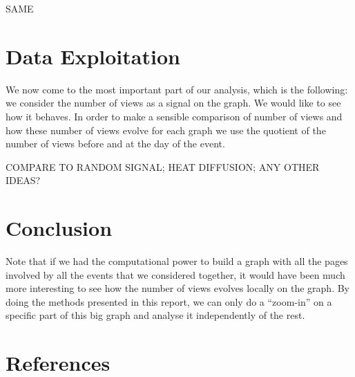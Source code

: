 \documentclass[conference]{IEEEtran}
\begin{document}
SAME 

\section{Data Exploitation} \label{exploitation}

We now come to the most important part of our analysis, which is the following: we consider the number of views as a signal on the graph. We would like to see how it behaves. In order to make a sensible comparison of number of views and how these number of views evolve for each graph we use the quotient of the number of views before and at the day of the event. 

COMPARE TO RANDOM SIGNAL; HEAT DIFFUSION; ANY OTHER IDEAS? 

\section{Conclusion} \label{conclusion}

Note that if we had the computational power to build a graph with all the pages involved by all the events that we considered together, it would have been much more interesting to see how the number of views evolves locally on the graph. By doing the methods presented in this report, we can only do a “zoom-in” on a specific part of this big graph and analyse it independently of the rest. 


\section*{References}


\cite{laplacian}  
\cite{signalprocessing}
\cite{clustering}



\end{document}
